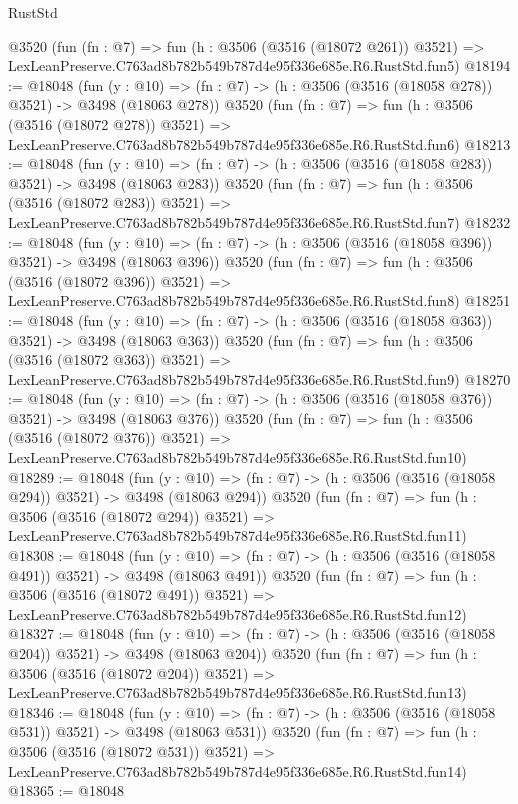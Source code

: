 \begin{lexlean}{RustStd}
\begin{coremodule}
    @3520
    (fun (fn : @7) =>
    fun (h : @3506 (@3516 (@18072 @261)) @3521) =>
    LexLeanPreserve.C763ad8b782b549b787d4e95f336e685e.R6.RustStd.fun5)
@18194 := @18048
    (fun (y : @10) => (fn : @7) -> (h : @3506 (@3516 (@18058 @278)) @3521) -> @3498 (@18063 @278))
    @3520
    (fun (fn : @7) =>
    fun (h : @3506 (@3516 (@18072 @278)) @3521) =>
    LexLeanPreserve.C763ad8b782b549b787d4e95f336e685e.R6.RustStd.fun6)
@18213 := @18048
    (fun (y : @10) => (fn : @7) -> (h : @3506 (@3516 (@18058 @283)) @3521) -> @3498 (@18063 @283))
    @3520
    (fun (fn : @7) =>
    fun (h : @3506 (@3516 (@18072 @283)) @3521) =>
    LexLeanPreserve.C763ad8b782b549b787d4e95f336e685e.R6.RustStd.fun7)
@18232 := @18048
    (fun (y : @10) => (fn : @7) -> (h : @3506 (@3516 (@18058 @396)) @3521) -> @3498 (@18063 @396))
    @3520
    (fun (fn : @7) =>
    fun (h : @3506 (@3516 (@18072 @396)) @3521) =>
    LexLeanPreserve.C763ad8b782b549b787d4e95f336e685e.R6.RustStd.fun8)
@18251 := @18048
    (fun (y : @10) => (fn : @7) -> (h : @3506 (@3516 (@18058 @363)) @3521) -> @3498 (@18063 @363))
    @3520
    (fun (fn : @7) =>
    fun (h : @3506 (@3516 (@18072 @363)) @3521) =>
    LexLeanPreserve.C763ad8b782b549b787d4e95f336e685e.R6.RustStd.fun9)
@18270 := @18048
    (fun (y : @10) => (fn : @7) -> (h : @3506 (@3516 (@18058 @376)) @3521) -> @3498 (@18063 @376))
    @3520
    (fun (fn : @7) =>
    fun (h : @3506 (@3516 (@18072 @376)) @3521) =>
    LexLeanPreserve.C763ad8b782b549b787d4e95f336e685e.R6.RustStd.fun10)
@18289 := @18048
    (fun (y : @10) => (fn : @7) -> (h : @3506 (@3516 (@18058 @294)) @3521) -> @3498 (@18063 @294))
    @3520
    (fun (fn : @7) =>
    fun (h : @3506 (@3516 (@18072 @294)) @3521) =>
    LexLeanPreserve.C763ad8b782b549b787d4e95f336e685e.R6.RustStd.fun11)
@18308 := @18048
    (fun (y : @10) => (fn : @7) -> (h : @3506 (@3516 (@18058 @491)) @3521) -> @3498 (@18063 @491))
    @3520
    (fun (fn : @7) =>
    fun (h : @3506 (@3516 (@18072 @491)) @3521) =>
    LexLeanPreserve.C763ad8b782b549b787d4e95f336e685e.R6.RustStd.fun12)
@18327 := @18048
    (fun (y : @10) => (fn : @7) -> (h : @3506 (@3516 (@18058 @204)) @3521) -> @3498 (@18063 @204))
    @3520
    (fun (fn : @7) =>
    fun (h : @3506 (@3516 (@18072 @204)) @3521) =>
    LexLeanPreserve.C763ad8b782b549b787d4e95f336e685e.R6.RustStd.fun13)
@18346 := @18048
    (fun (y : @10) => (fn : @7) -> (h : @3506 (@3516 (@18058 @531)) @3521) -> @3498 (@18063 @531))
    @3520
    (fun (fn : @7) =>
    fun (h : @3506 (@3516 (@18072 @531)) @3521) =>
    LexLeanPreserve.C763ad8b782b549b787d4e95f336e685e.R6.RustStd.fun14)
@18365 := @18048

\end{coremodule}
\end{lexlean}

